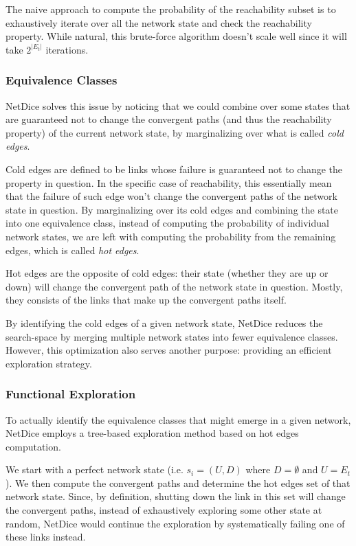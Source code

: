 \documentclass[10pt,sigconf,letterpaper,anonymous,nonacm]{acmart}
\begin{document}
The naive approach to compute the probability of the reachability subset is to exhaustively iterate 
over all the network state and check the reachability property. 
While natural, this brute-force algorithm doesn't scale well since it will take 
$2^{|E_t|}$ iterations. 

\subsubsection{Equivalence Classes}
NetDice \cite{steffen2020probabilistic} solves this issue by noticing that we could combine over 
some states that are guaranteed not to change the convergent paths (and thus the reachability 
property) of the current network state, by marginalizing over what is called \textit{cold edges}.

Cold edges are defined to be links whose failure is guaranteed not to change the property in 
question.
In the specific case of reachability, this essentially mean that the failure of such edge 
won't change the convergent paths of the network state in question.
By marginalizing over its cold edges and combining the state into one equivalence class, instead 
of computing the probability of individual network states, we are left with computing the 
probability from the remaining edges, which is called \textit{hot edges}.

Hot edges are the opposite of cold edges: their state (whether they are up or down) will change 
the convergent path of the network state in question.
Mostly, they consists of the links that make up the convergent paths itself.

By identifying the cold edges of a given network state, NetDice reduces the search-space by 
merging multiple network states into fewer equivalence classes. 
However, this optimization also serves another purpose: providing an efficient exploration 
strategy. 

\subsubsection{Functional Exploration}
To actually identify the equivalence classes that might emerge in a given network, NetDice employs
a tree-based exploration method based on hot edges computation.

We start with a perfect network state (i.e. $s_i = (U, D)$ where $D = \emptyset$ and $U = E_t$).
We then compute the convergent paths and determine the hot edges set of that network state.
Since, by definition, shutting down the link in this set will change the convergent paths, 
instead of exhaustively exploring some other state at random, NetDice would continue the 
exploration by systematically failing one of these links instead.
\end{document}
